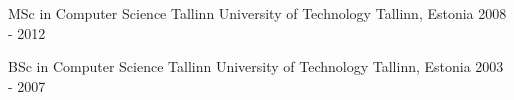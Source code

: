 
\begin{cventries}

  \cventry
    {MSc in Computer Science}
    {Tallinn University of Technology}
    {Tallinn, Estonia}
    {2008 - 2012}
    {
    }

  \cventry
    {BSc in Computer Science}
    {Tallinn University of Technology}
    {Tallinn, Estonia}
    {2003 - 2007}
    {
    }

\end{cventries}
